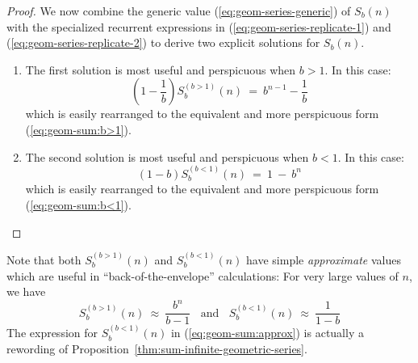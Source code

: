 \begin{proof}
\medskip

We now combine the generic value (\ref{eq:geom-series-generic}) of $S_b(n)$ with the specialized recurrent expressions in (\ref{eq:geom-series-replicate-1}) and (\ref{eq:geom-series-replicate-2}) to derive two explicit solutions for $S_b(n)$.
\begin{enumerate}
\item
The first solution is most useful and perspicuous when $b>1$.  In this case:
\[ \left( 1 - \frac{1}{b} \right)  S^{(b>1)}_{b}(n) \ = \ b^{n-1} - \frac{1}{b} \]
which is easily rearranged to the equivalent and more perspicuous form (\ref{eq:geom-sum:b>1}).

\item
The second solution is most useful and perspicuous when $b < 1$.  In this case:
\[ (1-b) S^{(b<1)}_{b}(n) \ = \ 1 \ - \ b^n \]
which is easily rearranged to the equivalent and more perspicuous form (\ref{eq:geom-sum:b<1}).
\end{enumerate}
\end{proof}

\medskip

Note that both $S^{(b>1)}_{b}(n)$ and $S^{(b<1)}_{b}(n)$ have simple {\em approximate} values which are useful in ``back-of-the-envelope'' calculations: For very large values of $n$, we have
\begin{equation}
\label{eq:geom-sum:approx}
S^{(b>1)}_{b}(n) \ \approx \ \frac{b^n}{b-1} \ \ \ \
\mbox{and} \ \ \ \
S^{(b<1)}_{b}(n) \ \approx \ \frac{1}{1-b} 
\end{equation}
The expression for $S^{(b<1)}_{b}(n)$ in (\ref{eq:geom-sum:approx}) is actually a rewording of
Proposition~\ref{thm:sum-infinite-geometric-series}.

\medskip

